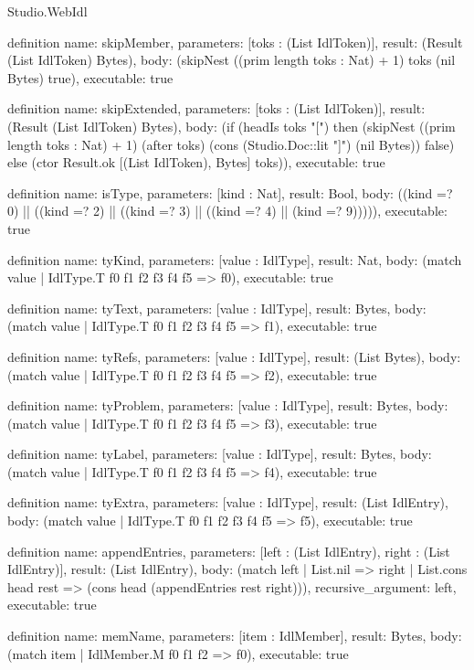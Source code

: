 \begin{lexlean}{Studio.WebIdl}
\begin{semanticmodule}
definition{
  name: skipMember,
  parameters: [toks : (List IdlToken)],
  result: (Result (List IdlToken) Bytes),
  body: (skipNest ((prim length toks : Nat) + 1) toks (nil Bytes) true),
  executable: true
}

definition{
  name: skipExtended,
  parameters: [toks : (List IdlToken)],
  result: (Result (List IdlToken) Bytes),
  body: (if (headIs toks "[") then (skipNest ((prim length toks : Nat) + 1) (after toks) (cons (Studio.Doc::lit "]") (nil Bytes)) false) else (ctor Result.ok [(List IdlToken), Bytes] toks)),
  executable: true
}

definition{
  name: isType,
  parameters: [kind : Nat],
  result: Bool,
  body: ((kind =? 0) || ((kind =? 2) || ((kind =? 3) || ((kind =? 4) || (kind =? 9))))),
  executable: true
}

definition{
  name: tyKind,
  parameters: [value : IdlType],
  result: Nat,
  body: (match value
    | IdlType.T f0 f1 f2 f3 f4 f5 => f0),
  executable: true
}

definition{
  name: tyText,
  parameters: [value : IdlType],
  result: Bytes,
  body: (match value
    | IdlType.T f0 f1 f2 f3 f4 f5 => f1),
  executable: true
}

definition{
  name: tyRefs,
  parameters: [value : IdlType],
  result: (List Bytes),
  body: (match value
    | IdlType.T f0 f1 f2 f3 f4 f5 => f2),
  executable: true
}

definition{
  name: tyProblem,
  parameters: [value : IdlType],
  result: Bytes,
  body: (match value
    | IdlType.T f0 f1 f2 f3 f4 f5 => f3),
  executable: true
}

definition{
  name: tyLabel,
  parameters: [value : IdlType],
  result: Bytes,
  body: (match value
    | IdlType.T f0 f1 f2 f3 f4 f5 => f4),
  executable: true
}

definition{
  name: tyExtra,
  parameters: [value : IdlType],
  result: (List IdlEntry),
  body: (match value
    | IdlType.T f0 f1 f2 f3 f4 f5 => f5),
  executable: true
}

definition{
  name: appendEntries,
  parameters: [left : (List IdlEntry), right : (List IdlEntry)],
  result: (List IdlEntry),
  body: (match left
    | List.nil => right
    | List.cons head rest => (cons head (appendEntries rest right))),
  recursive_argument: left,
  executable: true
}

definition{
  name: memName,
  parameters: [item : IdlMember],
  result: Bytes,
  body: (match item
    | IdlMember.M f0 f1 f2 => f0),
  executable: true
}


\end{semanticmodule}
\end{lexlean}
